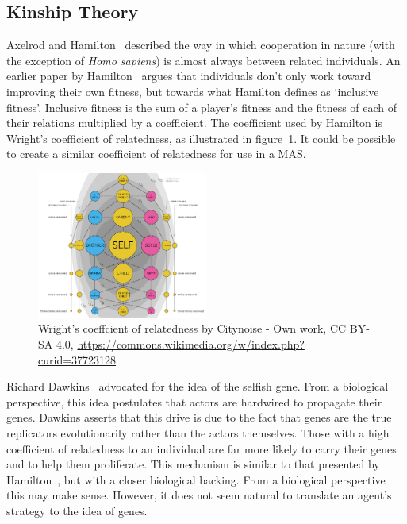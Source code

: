 \documentclass[]{final_report}
\begin{document}
\subsection{Kinship Theory}
\label{appendix:kin}
Axelrod and Hamilton~\cite{evolution_of_cooperation} described the way in which cooperation in nature (with the exception of \textit{Homo sapiens}) is almost always between related individuals. An earlier paper by Hamilton~\cite{kinhamilton} argues that individuals don't only work toward improving their own fitness, but towards what Hamilton defines as `inclusive fitness'. Inclusive fitness is the sum of a player's fitness and the fitness of each of their relations multiplied by a coefficient. The coefficient used by Hamilton is Wright's coefficient of relatedness, as illustrated in figure~\ref{fig:coefrelate}. It could be possible to create a similar coefficient of relatedness for use in a MAS.
\begin{figure}
	\center
	\includegraphics[width=0.5\textwidth]{coefrelate.png}
	\caption{Wright's coeffcient of relatedness by Citynoise - Own work, CC BY-SA 4.0, \url{https://commons.wikimedia.org/w/index.php?curid=37723128}}
	\label{fig:coefrelate}
\end{figure}
\par
Richard Dawkins~\cite{selfish_gene} advocated for the idea of the selfish gene. From a biological perspective, this idea postulates that actors are hardwired to propagate their genes. Dawkins asserts that this drive is due to the fact that genes are the true replicators evolutionarily rather than the actors themselves. Those with a high coefficient of relatedness to an individual are far more likely to carry their genes and to help them proliferate. This mechanism is similar to that presented by Hamilton~\cite{kinhamilton}, but with a closer biological backing. From a biological perspective this may make sense. However, it does not seem natural to translate an agent's strategy to the idea of genes.\par
\end{document}
